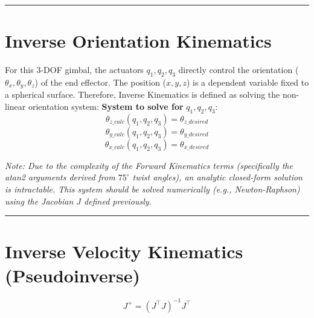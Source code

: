 \documentclass[11pt, a4paper]{article}
\begin{document}
\hrule

\section*{Inverse Orientation Kinematics}
For this 3-DOF gimbal, the actuators $q_1, q_2, q_3$ directly control the orientation ($\theta_x, \theta_y, \theta_z$) of the end effector. The position ($x, y, z$) is a dependent variable fixed to a spherical surface.
Therefore, Inverse Kinematics is defined as solving the non-linear orientation system:
\vspace{0.5cm}
\noindent\textbf{System to solve for} $q_1, q_2, q_3$:
\begin{dmath*} \theta_{z\_calc}(q_1, q_2, q_3) = \theta_{z\_desired}\end{dmath*}
\begin{dmath*} \theta_{y\_calc}(q_1, q_2, q_3) = \theta_{y\_desired}\end{dmath*}
\begin{dmath*} \theta_{x\_calc}(q_1, q_2, q_3) = \theta_{x\_desired}\end{dmath*}

\vspace{0.2cm}
\noindent\textit{Note: Due to the complexity of the Forward Kinematics terms (specifically the atan2 arguments derived from $75^\circ$ twist angles), an analytic closed-form solution is intractable. This system should be solved numerically (e.g., Newton-Raphson) using the Jacobian $J$ defined previously.}

\hrule

\section*{Inverse Velocity Kinematics (Pseudoinverse)}
$$ J^{+} = (J^\top J)^{-1} J^\top $$
\end{document}
